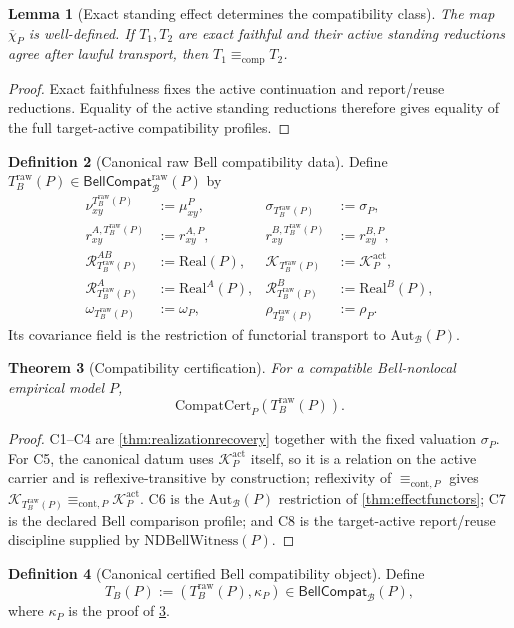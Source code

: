 \documentclass[11pt]{article}
\newtheorem{theorem}{Theorem}[section]
\newtheorem{lemma}[theorem]{Lemma}
\theoremstyle{definition}
\newtheorem{definition}[theorem]{Definition}
\newcommand{\Bell}{\mathcal{B}}
\newcommand{\NDBell}{\mathrm{NDBellWitness}}
\newcommand{\Real}{\mathrm{Real}}
\newcommand{\AutBell}{\mathrm{Aut}_{\Bell}(P)}
\newcommand{\CompEq}{\equiv_{\mathrm{comp}}}
\newcommand{\BellCompatRaw}{\mathsf{BellCompat}^{\mathrm{raw}}_{\Bell}(P)}
\newcommand{\BellCompat}{\mathsf{BellCompat}_{\Bell}(P)}
\newcommand{\CompatCert}{\mathrm{CompatCert}_{P}}
\newcommand{\RawTB}{T^{\mathrm{raw}}_{B}(P)}
\newcommand{\Active}{\mathrm{act}}
\newcommand{\ContEq}{\equiv_{\mathrm{cont},P}}
\begin{document}
\begin{lemma}[Exact standing effect determines the compatibility class]\label{lem:chibarwelldefined}
The map $\overline\chi_P$ is well-defined. If $T_1,T_2$ are exact faithful and their active standing reductions agree after lawful transport, then $T_1\CompEq T_2$.
\end{lemma}
\begin{proof}
Exact faithfulness fixes the active continuation and report/reuse reductions. Equality of the active standing reductions therefore gives equality of the full target-active compatibility profiles.
\end{proof}

\begin{definition}[Canonical raw Bell compatibility data]\label{def:canonicalcompatibilityraw}
Define $\RawTB\in\BellCompatRaw$ by
\[
\begin{aligned}
\nu^{\RawTB}_{xy}&:=\mu^P_{xy},&
\sigma_{\RawTB}&:=\sigma_P,\\
r^{A,\RawTB}_{xy}&:=r^{A,P}_{xy},&
r^{B,\RawTB}_{xy}&:=r^{B,P}_{xy},\\
\mathcal R^{AB}_{\RawTB}&:=\Real(P),&
\mathcal K_{\RawTB}&:=\mathcal K_P^{\Active},\\
\mathcal R^{A}_{\RawTB}&:=\Real^A(P),&
\mathcal R^{B}_{\RawTB}&:=\Real^B(P),\\
\omega_{\RawTB}&:=\omega_P,&
\rho_{\RawTB}&:=\rho_P.
\end{aligned}
\]
Its covariance field is the restriction of functorial transport to $\AutBell$.
\end{definition}

\begin{theorem}[Compatibility certification]\label{thm:residualtensor}
For a compatible Bell-nonlocal empirical model $P$,
\[
\CompatCert(\RawTB).
\]
\end{theorem}
\begin{proof}
C1--C4 are \cref{thm:realizationrecovery} together with the fixed valuation $\sigma_P$. For C5, the canonical datum uses $\mathcal K_P^{\Active}$ itself, so it is a relation on the active carrier and is reflexive-transitive by construction; reflexivity of $\ContEq$ gives $\mathcal K_{\RawTB}\ContEq\mathcal K_P^{\Active}$. C6 is the $\AutBell$ restriction of \cref{thm:effectfunctors}; C7 is the declared Bell comparison profile; and C8 is the target-active report/reuse discipline supplied by $\NDBell(P)$.
\end{proof}

\begin{definition}[Canonical certified Bell compatibility object]\label{def:canonicalcompatibility}
Define
\[
T_B(P):=(\RawTB,\kappa_P)\in\BellCompat,
\]
where $\kappa_P$ is the proof of \cref{thm:residualtensor}.
\end{definition}
\end{document}
